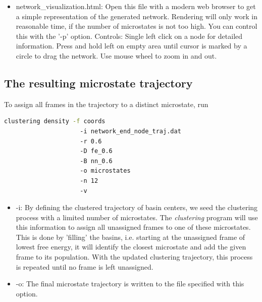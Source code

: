 \documentclass[12pt,a4paper,twoside,english,fleqn]{article}
\begin{document}
\begin{itemize}
  \item network\_visualization.html: Open this file with a modern web browser
                                     to get a simple representation of the
                                     generated network. Rendering will only
                                     work in reasonable time, if the number of
                                     microstates is not too high. You can
                                     control this with the '-p' option.
                                     Controls: Single left click on a node for
                                     detailed information. Press and hold left
                                     on empty area until cursor is marked by a
                                     circle to drag the network.
                                     Use mouse wheel to zoom in and out.
\end{itemize}


\subsection{The resulting microstate trajectory}
To assign all frames in the trajectory to a distinct microstate, run
\begin{lstlisting}[language=bash,basicstyle=\ttfamily]
  clustering density -f coords
                     -i network_end_node_traj.dat
                     -r 0.6
                     -D fe_0.6
                     -B nn_0.6
                     -o microstates
                     -n 12
                     -v
\end{lstlisting}

\begin{itemize}
  \item -i: By defining the clustered trajectory of basin centers, we seed the
            clustering process with a limited number of microstates.
            The \emph{clustering} program will use this information to assign
            all unassigned frames to one of these microstates.
            This is done by 'filling' the basins, i.e. starting at the
            unassigned frame of lowest free energy, it will identify the
            closest microstate and add the given frame to its population.
            With the updated clustering trajectory, this process is repeated
            until no frame is left unassigned.
  \item -o: The final microstate trajectory is written to the file specified
            with this option.
\end{itemize}
\end{document}
